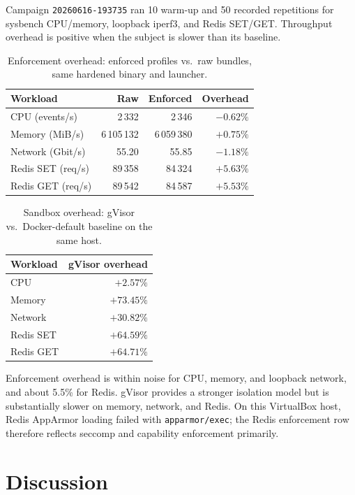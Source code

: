 \documentclass[runningheads]{llncs}
\begin{document}
Campaign \texttt{20260616-193735} ran 10 warm-up and 50 recorded repetitions for sysbench CPU/memory, loopback iperf3, and Redis SET/GET. Throughput overhead is positive when the subject is slower than its baseline.

\begin{table}
\caption{Enforcement overhead: enforced profiles vs.\ raw bundles, same hardened binary and launcher.}
\label{tab:enforcement}
\centering
\begin{tabular}{p{2.5cm}rrr}
\toprule
\textbf{Workload} & \textbf{Raw} & \textbf{Enforced} & \textbf{Overhead} \\
\midrule
CPU (events/s) & 2\,332 & 2\,346 & $-0.62\%$ \\
Memory (MiB/s) & 6\,105\,132 & 6\,059\,380 & $+0.75\%$ \\
Network (Gbit/s) & 55.20 & 55.85 & $-1.18\%$ \\
Redis SET (req/s) & 89\,358 & 84\,324 & $+5.63\%$ \\
Redis GET (req/s) & 89\,542 & 84\,587 & $+5.53\%$ \\
\bottomrule
\end{tabular}
\end{table}

\begin{table}
\caption{Sandbox overhead: gVisor vs.\ Docker-default baseline on the same host.}
\label{tab:gvisor-overhead}
\centering
\begin{tabular}{lr}
\toprule
\textbf{Workload} & \textbf{gVisor overhead} \\
\midrule
CPU & $+2.57\%$ \\
Memory & $+73.45\%$ \\
Network & $+30.82\%$ \\
Redis SET & $+64.59\%$ \\
Redis GET & $+64.71\%$ \\
\bottomrule
\end{tabular}
\end{table}

Enforcement overhead is within noise for CPU, memory, and loopback network, and about 5.5\% for Redis. gVisor provides a stronger isolation model but is substantially slower on memory, network, and Redis. On this VirtualBox host, Redis AppArmor loading failed with \texttt{apparmor/exec}; the Redis enforcement row therefore reflects seccomp and capability enforcement primarily.

\section{Discussion}\label{sec:analysis}
\end{document}
